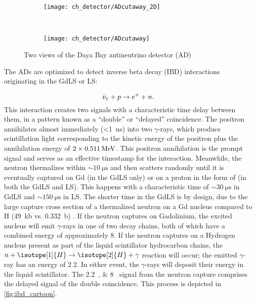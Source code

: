 \begin{figure}
    \centering
    \begin{subfigure}{\textwidth}
        \centering
        \texttt{[image: ch\_detector/ADcutaway\_2D]}
    \end{subfigure}
    \vspace{1cm}\\
    \begin{subfigure}[0.4\textheight]{\textwidth}
        \centering
        \texttt{[image: ch\_detector/ADcutaway]}
    \end{subfigure}
    \caption{Two views of the Daya Bay antineutrino detector (AD)}
    \label{fig:ad_cutaway}
\end{figure}



The ADs are optimized to detect inverse beta decay (IBD) interactions
originating in the GdLS or LS:

\begin{equation}
    \bar{\nu}_e + p \to e^+ + n.
\end{equation}
This interaction creates two signals with a characteristic
time delay between them, in a pattern known as a ``double''
or ``delayed'' coincidence.
The positron annihilates almost immediately (\SI{<1}{\nano\second})
into two $\gamma$-rays, which produce scintillation light
corresponding to the kinetic energy of the positron plus the
annihilation energy of $2\times \SI{0.511}{\mega\electronvolt}$.
This positron annihilation is the prompt signal
and serves as an effective timestamp for the interaction.
Meanwhile, the neutron thermalizes within $\sim \SI{10}{\micro\second}$
and then scatters randomly until it is eventually captured
on Gd (in the GdLS only) or on a proton in the form of 
(in both the GdLS and LS).
This happens with a characteristic time of $\sim \SI{30}{\micro\second}$
in GdLS and $\sim \SI{150}{\micro\second}$ in LS.
The shorter time in the GdLS is by design,
due to the large capture cross section of a thermalized neutron
on a Gd nucleus compared to H (\SI{49}{\kilo\barn} vs. \SI{0.332}{\barn})
\cite{gdls2014}.
If the neutron captures on Gadolinium, the excited nucleus
will emit $\gamma$-rays in one of two decay chains,
both of which have a combined energy of approximately \SI{8}{\mev}.
If the neutron captures on a Hydrogen nucleus present as part of
the liquid scintillator hydrocarbon chains,
the $n+\isotope[1]{H} \to \isotope[2]{H} + \gamma$ reaction will occur;
the emitted $\gamma$-ray has an energy of \SI{2.2}{\mev}.
In either event, the $\gamma$-rays will deposit their energy
in the liquid scintillator.
The \SIlist[list-pair-separator = { or }]{2.2;8}{\mev} signal
from the neutron capture comprises the delayed signal of the
double coincidence.
This process is depicted in \cref{fig:ibd_cartoon}.

